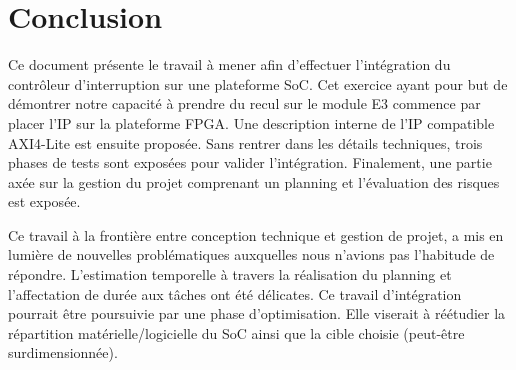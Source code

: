 \section{Conclusion}
Ce document présente le travail à mener afin d’effectuer l’intégration du contrôleur d'interruption sur une plateforme SoC.
Cet exercice ayant pour but de démontrer notre capacité à prendre du recul sur le module E3 commence par placer l'IP sur la plateforme FPGA.
Une description interne de l'IP compatible AXI4-Lite est ensuite proposée.
Sans rentrer dans les détails techniques, trois phases de tests sont exposées pour valider l'intégration.
Finalement, une partie axée sur la gestion du projet comprenant un planning et l'évaluation des risques est exposée.

Ce travail à la frontière entre conception technique et gestion de projet, a mis en lumière de nouvelles problématiques auxquelles nous n'avions pas l'habitude de répondre.
L'estimation temporelle à travers la réalisation du planning et l'affectation de durée aux tâches ont été délicates.
Ce travail d'intégration pourrait être poursuivie par une phase d'optimisation.
Elle viserait à réétudier la répartition matérielle/logicielle du SoC ainsi que la cible choisie (peut-être surdimensionnée).
